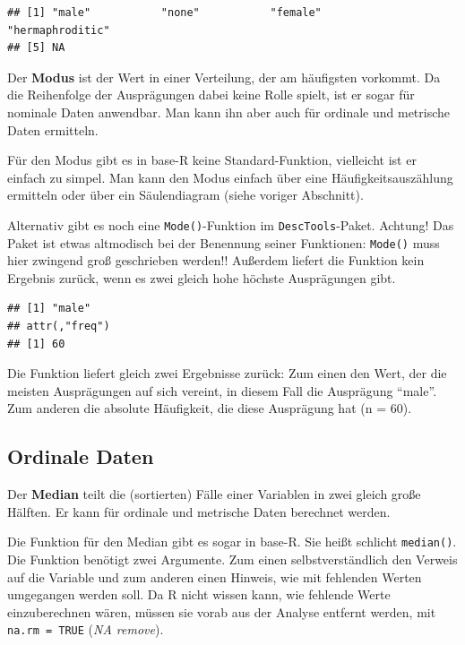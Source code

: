 \documentclass[
]{book}
\newenvironment{Shaded}{\begin{snugshade}}{\end{snugshade}}
\newcommand{\AttributeTok}[1]{\textcolor[rgb]{0.77,0.63,0.00}{#1}}
\newcommand{\ConstantTok}[1]{\textcolor[rgb]{0.00,0.00,0.00}{#1}}
\newcommand{\FunctionTok}[1]{\textcolor[rgb]{0.00,0.00,0.00}{#1}}
\newcommand{\NormalTok}[1]{#1}
\newcommand{\SpecialCharTok}[1]{\textcolor[rgb]{0.00,0.00,0.00}{#1}}
\begin{document}
\begin{verbatim}
## [1] "male"           "none"           "female"         "hermaphroditic"
## [5] NA
\end{verbatim}

Der \textbf{Modus} ist der Wert in einer Verteilung, der am häufigsten vorkommt. Da die Reihenfolge der Ausprägungen dabei keine Rolle spielt, ist er sogar für nominale Daten anwendbar. Man kann ihn aber auch für ordinale und metrische Daten ermitteln.

Für den Modus gibt es in base-R keine Standard-Funktion, vielleicht ist er einfach zu simpel. Man kann den Modus einfach über eine Häufigkeitsauszählung ermitteln oder über ein Säulendiagram (siehe voriger Abschnitt).

Alternativ gibt es noch eine \texttt{Mode()}-Funktion im \texttt{DescTools}-Paket. Achtung! Das Paket ist etwas altmodisch bei der Benennung seiner Funktionen: \texttt{Mode()} muss hier zwingend groß geschrieben werden!! Außerdem liefert die Funktion kein Ergebnis zurück, wenn es zwei gleich hohe höchste Ausprägungen gibt.

\begin{Shaded}
\end{Shaded}

\begin{verbatim}
## [1] "male"
## attr(,"freq")
## [1] 60
\end{verbatim}

Die Funktion liefert gleich zwei Ergebnisse zurück: Zum einen den Wert, der die meisten Ausprägungen auf sich vereint, in diesem Fall die Ausprägung ``male''. Zum anderen die absolute Häufigkeit, die diese Ausprägung hat (n = 60).

\hypertarget{ordinale-daten}{%
\subsection{Ordinale Daten}\label{ordinale-daten}}

Der \textbf{Median} teilt die (sortierten) Fälle einer Variablen in zwei gleich große Hälften. Er kann für ordinale und metrische Daten berechnet werden.

Die Funktion für den Median gibt es sogar in base-R. Sie heißt schlicht \texttt{median()}. Die Funktion benötigt zwei Argumente. Zum einen selbstverständlich den Verweis auf die Variable und zum anderen einen Hinweis, wie mit fehlenden Werten umgegangen werden soll. Da R nicht wissen kann, wie fehlende Werte einzuberechnen wären, müssen sie vorab aus der Analyse entfernt werden, mit \texttt{na.rm\ =\ TRUE} (\emph{NA remove}).
\end{document}
